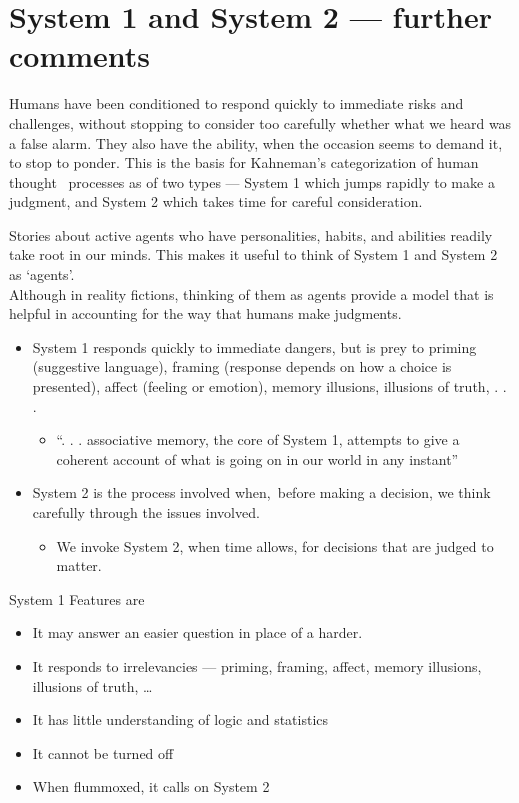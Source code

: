 \documentclass[
  10pt,
  b5paper]{book}
\providecommand{\tightlist}{%
  \setlength{\itemsep}{0pt}\setlength{\parskip}{0pt}}
\begin{document}
\hypertarget{system-1-and-system-2-further-comments}{%
\section{System 1 and System 2 --- further comments}\label{system-1-and-system-2-further-comments}}

Humans have been conditioned to respond quickly to immediate risks and challenges, without stopping to consider too carefully whether what we heard was a false alarm. They also have the ability, when the occasion seems to demand it, to stop to ponder. This is the basis for Kahneman's categorization of human thought~ processes as of two types --- System 1 which jumps rapidly to make a judgment, and System 2 which takes time for careful consideration.

Stories about active agents who have personalities, habits, and abilities readily take root in our minds. This makes it useful to think of System 1 and System 2 as `agents'.\\
Although in reality fictions, thinking of them as agents provide a model that is helpful in accounting for the way that humans make judgments.

\begin{itemize}
\tightlist
\item
  System 1 responds quickly to immediate dangers, but is prey to priming (suggestive language), framing (response depends on how a choice is presented), affect (feeling or emotion), memory illusions, illusions of truth, . . .

  \begin{itemize}
  \tightlist
  \item
    ``. . . associative memory, the core of System 1, attempts to give a coherent account of what is going on in our world in any instant''
  \end{itemize}
\item
  System 2 is the process involved when,~before making a decision, we think carefully through the issues involved.

  \begin{itemize}
  \tightlist
  \item
    We invoke System 2, when time allows, for decisions that are judged to matter.
  \end{itemize}
\end{itemize}

System 1 Features are

\begin{itemize}
\tightlist
\item
  It may answer an easier question in place of a harder.
\item
  It responds to irrelevancies --- priming, framing, affect, memory illusions, illusions of truth, \ldots{}
\item
  It has little understanding of logic and statistics
\item
  It cannot be turned off
\item
  When flummoxed, it calls on System 2
\end{itemize}
\end{document}
